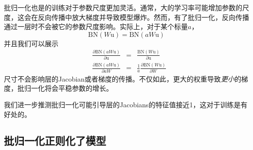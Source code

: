 \documentclass[../main.tex]{subfile}
\begin{document}
批归一化也是的训练对于参数尺度更加灵活。通常，大的学习率可能增加参数的尺度，这会在反向传播中放大梯度并导致模型爆炸。然而，有了批归一化，反向传播通过一层时不会被它的参数尺度影响。实际上，对于某个标量$a$，
\begin{equation*}
    \text{BN}\left(W\text{u}\right) = \text{BN}\left(aW\text{u}\right)
\end{equation*}
并且我们可以展示
\begin{equation*}
    \begin{aligned}
         & \frac{\partial \text{BN}\left(aW\text{u}\right)}{\partial \text{u}} & = & \frac{\text{BN}\left(W\text{u}\right)}{\partial \text{u}}               \\
         & \frac{\partial \text{BN}\left(aW\text{u}\right)}{\partial aW}       & = & \frac{1}{a} \frac{\partial \text{BN}\left(W\text{u}\right)}{\partial W}
    \end{aligned}
\end{equation*}
尺寸不会影响层的Jacobian或者梯度的传播。不仅如此，更大的权重导致\textit{更小}的梯度，批归一化将会平稳参数的增长。

我们进一步推测批归一化可能引导层的Jacobians的特征值接近1，这对于训练是有好处的。

\subsection{批归一化正则化了模型}
\end{document}

